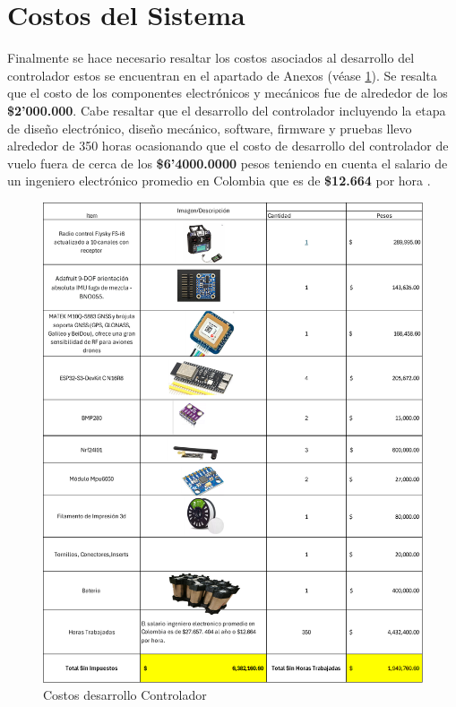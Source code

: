 \section{Costos del Sistema}

Finalmente se hace necesario resaltar los costos asociados al desarrollo del controlador estos  se encuentran en el apartado de Anexos (véase \ref{fig:costesDesarrolloControlador}). Se resalta que el costo de los componentes electrónicos y mecánicos fue de alrededor de los \textbf{\$2'000.000}. Cabe resaltar que el desarrollo del controlador incluyendo la etapa de diseño electrónico, diseño mecánico, software, firmware y pruebas llevo alrededor de 350 horas ocasionando que el costo de desarrollo del controlador de vuelo fuera de cerca de los \textbf{\$6'4000.0000} pesos teniendo en cuenta el salario de un ingeniero electrónico promedio en Colombia que es de \textbf{ \$12.664} por hora .  

\begin{figure}[H]
    \centering
    \includegraphics[width=13 cm]{Imagenes/Costos/presupuesto.png}
    \caption{Costos desarrollo Controlador }
    \label{fig:costesDesarrolloControlador}
\end{figure}